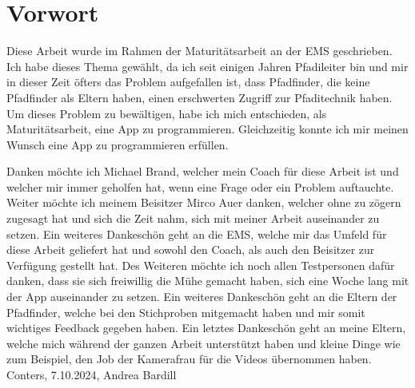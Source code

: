 \chapter*{Vorwort}

Diese Arbeit wurde im Rahmen der Maturitätsarbeit an der EMS geschrieben. Ich habe dieses Thema gewählt, da ich seit einigen Jahren Pfadileiter bin und mir in dieser Zeit öfters das Problem aufgefallen ist, dass Pfadfinder, die keine Pfadfinder als Eltern haben, einen erschwerten Zugriff zur Pfaditechnik haben. Um dieses Problem zu bewältigen, habe ich mich entschieden, als Maturitätsarbeit, eine App zu programmieren. Gleichzeitig konnte ich mir meinen Wunsch eine App zu programmieren erfüllen. \par
Danken möchte ich Michael Brand, welcher mein Coach für diese Arbeit ist und welcher mir immer geholfen hat, wenn eine Frage oder ein Problem auftauchte. Weiter möchte ich meinem Beisitzer Mirco Auer danken, welcher ohne zu zögern zugesagt hat und sich die Zeit nahm, sich mit meiner Arbeit auseinander zu setzen. Ein weiteres Dankeschön geht an die EMS, welche mir das Umfeld für diese Arbeit geliefert hat und sowohl den Coach, als auch den Beisitzer zur Verfügung gestellt hat. Des Weiteren möchte ich noch allen Testpersonen dafür danken, dass sie sich freiwillig die Mühe gemacht haben, sich eine Woche lang mit der App auseinander zu setzen. Ein weiteres Dankeschön geht an die Eltern der Pfadfinder, welche bei den Stichproben mitgemacht haben und mir somit wichtiges Feedback gegeben haben. Ein letztes Dankeschön geht an meine Eltern, welche mich während der ganzen Arbeit unterstützt haben und kleine Dinge wie zum Beispiel, den Job der Kamerafrau für die Videos übernommen haben. 
\vfill
\noindent
Conters, 7.10.2024, Andrea Bardill